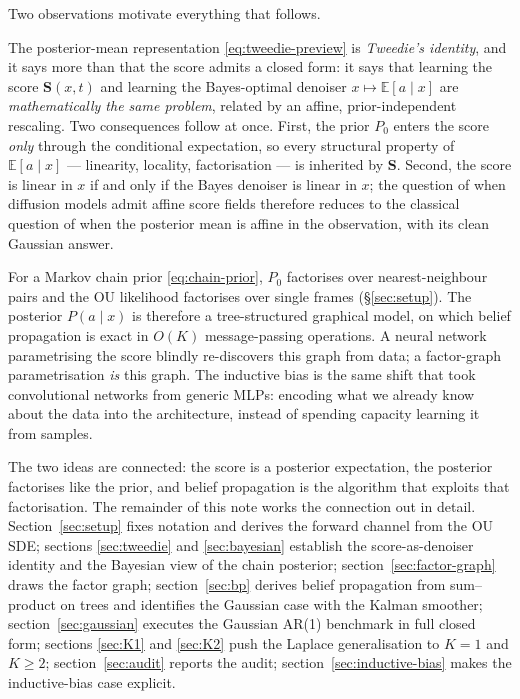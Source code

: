 \documentclass[11pt]{article}
\theoremstyle{definition}
\newcommand{\E}{\mathbb{E}}
\begin{document}
Two observations motivate everything that follows.

\begin{intuition}
The posterior-mean representation \eqref{eq:tweedie-preview} is
\emph{Tweedie's identity}, and it says more than that the score admits a
closed form: it says that learning the score \(\mathbf S(x, t)\) and
learning the Bayes-optimal denoiser \(x \mapsto \E[a \mid x]\) are
\emph{mathematically the same problem}, related by an affine,
prior-independent rescaling. Two consequences follow at once. First, the
prior \(P_0\) enters the score \emph{only} through the conditional
expectation, so every structural property of \(\E[a \mid x]\) ---
linearity, locality, factorisation --- is inherited by \(\mathbf S\).
Second, the score is linear in \(x\) if and only if the Bayes denoiser
is linear in \(x\); the question of when diffusion models admit affine
score fields therefore reduces to the classical question of when the
posterior mean is affine in the observation, with its clean Gaussian
answer.
\end{intuition}

\begin{intuition}
For a Markov chain prior \eqref{eq:chain-prior}, \(P_0\) factorises over
nearest-neighbour pairs and the OU likelihood factorises over single
frames (\S\ref{sec:setup}). The posterior \(P(a \mid x)\) is therefore a
tree-structured graphical model, on which belief propagation is exact
in \(O(K)\) message-passing operations. A neural network parametrising
the score blindly re-discovers this graph from data; a factor-graph
parametrisation \emph{is} this graph. The inductive bias is the same
shift that took convolutional networks from generic MLPs: encoding what
we already know about the data into the architecture, instead of
spending capacity learning it from samples.
\end{intuition}

The two ideas are connected: the score is a posterior expectation, the
posterior factorises like the prior, and belief propagation is the
algorithm that exploits that factorisation. The remainder of this note
works the connection out in detail. Section~\ref{sec:setup} fixes
notation and derives the forward channel from the OU SDE; sections
\ref{sec:tweedie} and \ref{sec:bayesian} establish the score-as-denoiser
identity and the Bayesian view of the chain posterior;
section~\ref{sec:factor-graph} draws the factor graph;
section~\ref{sec:bp} derives belief propagation from sum--product on
trees and identifies the Gaussian case with the Kalman smoother;
section~\ref{sec:gaussian} executes the Gaussian AR(1) benchmark in full
closed form; sections \ref{sec:K1} and \ref{sec:K2} push the Laplace
generalisation to \(K = 1\) and \(K \geq 2\); section~\ref{sec:audit}
reports the audit; section~\ref{sec:inductive-bias} makes the
inductive-bias case explicit.
\end{document}
